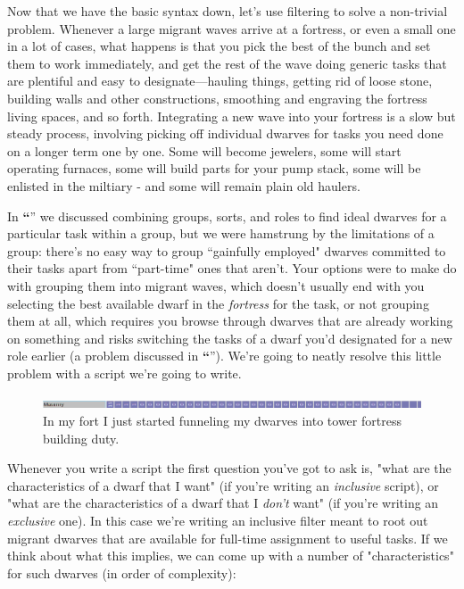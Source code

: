 \documentclass[]{article}
\newcommand{\jump}[1] {\textbf{``\nameref{sec:#1}}''}
\newcommand{\legacy}[1] {
\begin{center}
\colorbox{legacy-content}{
\begin{minipage}[t]{0.95\linewidth}
#1
\end{minipage}
}
\end{center}
}
\begin{document}

Now that we have the basic syntax down, let's use filtering to solve a non-trivial problem. Whenever a
large migrant waves arrive at a fortress, or even a small one in a lot of cases, what happens is that you
pick the best of the bunch and set them to work immediately, and get the rest of the wave doing generic
tasks that are plentiful and easy to designate---hauling things, getting rid of loose stone, building
walls and other constructions, smoothing and engraving the fortress living spaces, and so forth.
Integrating a new wave into your fortress is a slow but steady process, involving picking off individual
dwarves for tasks you need done on a longer term one by one. Some will become jewelers, some will start
operating furnaces, some will build parts for your pump stack, some will be enlisted in the miltiary -
and some will remain plain old haulers.

In  \jump{Using Roles} we discussed combining groups, sorts, and roles to find ideal
dwarves for a particular task within a group, but we were hamstrung by the limitations of a group:
there's no easy way to group ``gainfully employed" dwarves committed to their tasks apart from
``part-time" ones that aren't. Your options were to make do with grouping them into migrant waves, which
doesn't usually end with you selecting the best available dwarf in the \emph{fortress} for the task, or
not grouping them at all, which requires you browse through dwarves that are already working on something
and risks switching the tasks of a dwarf you'd designated for a new role earlier (a problem discussed in
\jump{Assigning Nicknames}). We're going to neatly resolve this little problem with a
script we're going to write.

\begin{figure}[h!]
\centering
\includegraphics[scale=.73]{Sec4Fig2}
\caption{In my fort I just started funneling my dwarves into tower fortress building duty.}
\end{figure}

Whenever you write a script the first question you've got to ask is, "what are the characteristics of a
dwarf that I want" (if you're writing an \emph{inclusive} script), or "what are the characteristics of a
dwarf that I \emph{don't} want" (if you're writing an \emph{exclusive} one). In this case we're writing
an inclusive filter meant to root out migrant dwarves that are available for full-time assignment to
useful tasks. If we think about what this implies, we can come up with a number of "characteristics" for
such dwarves (in order of complexity):
\end{document}
